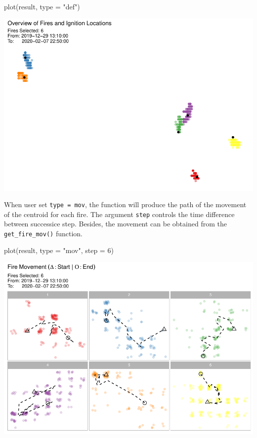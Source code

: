 \begin{Schunk}
\begin{Sinput}
plot(result, type = "def")
\end{Sinput}


\begin{center}\includegraphics[width=0.8\linewidth]{clustering_paper_files/figure-latex/unnamed-chunk-11-1} \end{center}

\end{Schunk}

When user set \texttt{type\ =\ \textquotesingle{}mov\textquotesingle{}},
the function will produce the path of the movement of the centroid for
each fire. The argument \texttt{step} controls the time difference
between successice step. Besides, the movement can be obtained from the
\texttt{get\_fire\_mov()} function.

\begin{Schunk}
\begin{Sinput}
plot(result, type = "mov", step = 6)
\end{Sinput}


\begin{center}\includegraphics[width=0.8\linewidth]{clustering_paper_files/figure-latex/unnamed-chunk-12-1} \end{center}

\end{Schunk}


